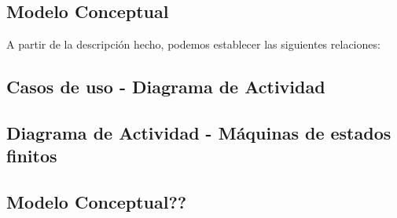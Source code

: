 \subsection{Modelo Conceptual}

A partir de la descripción hecho, podemos establecer las siguientes relaciones:
\subsection{Casos de uso - Diagrama de Actividad}

\subsection{Diagrama de Actividad - Máquinas de estados finitos}

\subsection{Modelo Conceptual??}